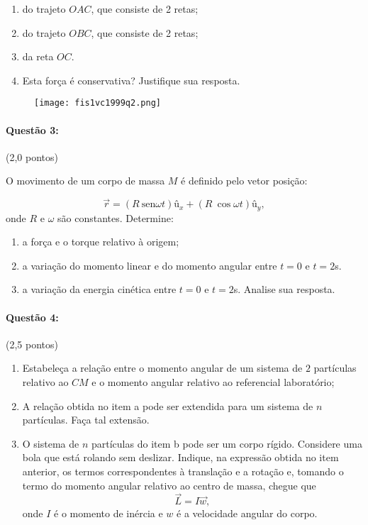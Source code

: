 \documentclass[12pt,a4paper]{article}
\newcommand{\sen}{\mathrm{sen}}
\begin{document}
\begin{enumerate}[label=\alph*)]
\item do trajeto $OAC$, que consiste de 2 retas;
\item do trajeto $OBC$, que consiste de 2 retas;
\item da reta $OC$.
\item Esta força é conservativa? Justifique sua resposta.
\end{enumerate}

\begin{figure}[ht]
\centering
\texttt{[image: fis1vc1999q2.png]}
\end{figure}

\paragraph{Questão 3:} (2,0 pontos)

O movimento de um corpo de massa $M$ é definido pelo vetor posição:

$$ \overrightarrow{r}= (R \ \sen \omega t)\textrm{û}_x +(R \ \cos\omega t) \textrm{û}_y, $$
onde $R$ e $\omega$ são constantes. Determine:

\begin{enumerate}[label=\alph*)]
\item a força e o torque relativo à origem;
\item a variação do momento linear e do momento angular entre $t=0$ e $t=2$s.
\item a variação da energia cinética entre $t=0$ e $t=2$s. Analise sua resposta.
\end{enumerate}

\paragraph{Questão 4:} (2,5 pontos)
\begin{enumerate}[label=\alph*)]
\item Estabeleça a relação entre o momento angular de um sistema de $2$ partículas relativo ao $CM$ e o momento angular relativo ao referencial laboratório;
\item A relação obtida no item a pode ser extendida para um sistema de $n$ partículas. Faça tal extensão.
\item O sistema de $n$ partículas do item b pode ser um corpo rígido. Considere uma bola que está rolando sem deslizar. 
Indique, na expressão obtida no item anterior, os termos correspondentes à translação e a rotação e, tomando o termo do momento angular relativo ao centro de massa, chegue que
$$ \overrightarrow{L}=I\overrightarrow{w},$$
onde $I$ é o momento de inércia e $w$ é a velocidade angular do corpo.
\end{enumerate}
\end{document}

